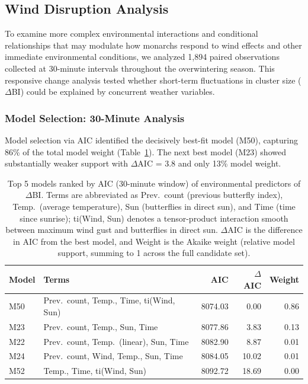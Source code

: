 \documentclass[insects,article,submit,pdftex,moreauthors]{Definitions/mdpi}
\begin{document}
\subsection{Wind Disruption Analysis}

To examine more complex environmental interactions and conditional relationships that may modulate how monarchs respond to wind effects and other immediate environmental conditions, we analyzed 1,894 paired observations collected at 30-minute intervals throughout the overwintering season. This responsive change analysis tested whether short-term fluctuations in cluster size ($\Delta$BI) could be explained by concurrent weather variables.

\subsubsection{Model Selection: 30-Minute Analysis}

Model selection via AIC identified the decisively best-fit model (M50), capturing 86\% of the total model weight (Table~\ref{tab:model_selection_30min}). The next best model (M23) showed substantially weaker support with $\Delta$AIC = 3.8 and only 13\% model weight.

\begin{table}[H]
\caption{Top 5 models ranked by AIC (30-minute window) of environmental predictors of $\Delta$BI. Terms are abbreviated as Prev.\ count (previous butterfly index), Temp.\ (average temperature), Sun (butterflies in direct sun), and Time (time since sunrise); ti(Wind, Sun) denotes a tensor-product interaction smooth between maximum wind gust and butterflies in direct sun. $\Delta$AIC is the difference in AIC from the best model, and Weight is the Akaike weight (relative model support, summing to 1 across the full candidate set).}
\label{tab:model_selection_30min}
\centering
\small
\begin{tabular}{llrrr}
\toprule
\textbf{Model} & \textbf{Terms} & \textbf{AIC} & \textbf{$\Delta$AIC} & \textbf{Weight} \\
\midrule
M50 & Prev.\ count, Temp., Time, ti(Wind, Sun) & 8074.03 & 0.00 & 0.86 \\
M23 & Prev.\ count, Temp., Sun, Time & 8077.86 & 3.83 & 0.13 \\
M22 & Prev.\ count, Temp.\ (linear), Sun, Time & 8082.90 & 8.87 & 0.01 \\
M24 & Prev.\ count, Wind, Temp., Sun, Time & 8084.05 & 10.02 & 0.01 \\
M52 & Temp., Time, ti(Wind, Sun) & 8092.72 & 18.69 & 0.00 \\
\bottomrule
\end{tabular}
\end{table}
\end{document}

